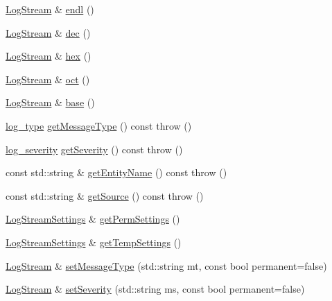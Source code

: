 \begin{DoxyCompactItemize}
\item 
\hyperlink{classkisscpp_1_1_log_stream}{Log\-Stream} \& \hyperlink{classkisscpp_1_1_log_stream_ab672ebf40d6162ba7114355d2c2cc7dd}{endl} ()
\item 
\hyperlink{classkisscpp_1_1_log_stream}{Log\-Stream} \& \hyperlink{classkisscpp_1_1_log_stream_a8ed923f031fb6fd9c981d8c694c16a92}{dec} ()
\item 
\hyperlink{classkisscpp_1_1_log_stream}{Log\-Stream} \& \hyperlink{classkisscpp_1_1_log_stream_afdfaf9b54bf9ab3f95613fff8fe493a1}{hex} ()
\item 
\hyperlink{classkisscpp_1_1_log_stream}{Log\-Stream} \& \hyperlink{classkisscpp_1_1_log_stream_ab8f40d07bbf5dccf2a6c2033405dd2be}{oct} ()
\item 
\hyperlink{classkisscpp_1_1_log_stream}{Log\-Stream} \& \hyperlink{classkisscpp_1_1_log_stream_a857e9c930544fe22317b9be6a7d0d9ce}{base} ()
\item 
\hyperlink{namespacekisscpp_a18db16d1f4c281bec16e637c56b0cc88}{log\-\_\-type} \hyperlink{classkisscpp_1_1_log_stream_ac3448c21e8d5528907744ab2344b170f}{get\-Message\-Type} () const   throw ()
\item 
\hyperlink{namespacekisscpp_a2479a56cdedf21357ca5c68adc699d00}{log\-\_\-severity} \hyperlink{classkisscpp_1_1_log_stream_a8deec7dc1e77cdf99e99d8be56660151}{get\-Severity} () const   throw ()
\item 
const std\-::string \& \hyperlink{classkisscpp_1_1_log_stream_a37cf1aef25583d4544d149d5f2c7abe6}{get\-Entity\-Name} () const   throw ()
\item 
const std\-::string \& \hyperlink{classkisscpp_1_1_log_stream_a9c62fef30deb7557b7920580ab4a389a}{get\-Source} () const   throw ()
\item 
\hyperlink{classkisscpp_1_1_log_stream_settings}{Log\-Stream\-Settings} \& \hyperlink{classkisscpp_1_1_log_stream_a3b4c04dc683fdd8bcf54b3bdcb2906a0}{get\-Perm\-Settings} ()
\item 
\hyperlink{classkisscpp_1_1_log_stream_settings}{Log\-Stream\-Settings} \& \hyperlink{classkisscpp_1_1_log_stream_a7a5c468e5c33c028737a733c7510bc74}{get\-Temp\-Settings} ()
\item 
\hyperlink{classkisscpp_1_1_log_stream}{Log\-Stream} \& \hyperlink{classkisscpp_1_1_log_stream_ae71eea1ac14056104afb50c60740357f}{set\-Message\-Type} (std\-::string mt, const bool permanent=false)
\item 
\hyperlink{classkisscpp_1_1_log_stream}{Log\-Stream} \& \hyperlink{classkisscpp_1_1_log_stream_a7cf4acefb95c5bee8ec7fc1ae346dca3}{set\-Severity} (std\-::string ms, const bool permanent=false)

\end{DoxyCompactItemize}
